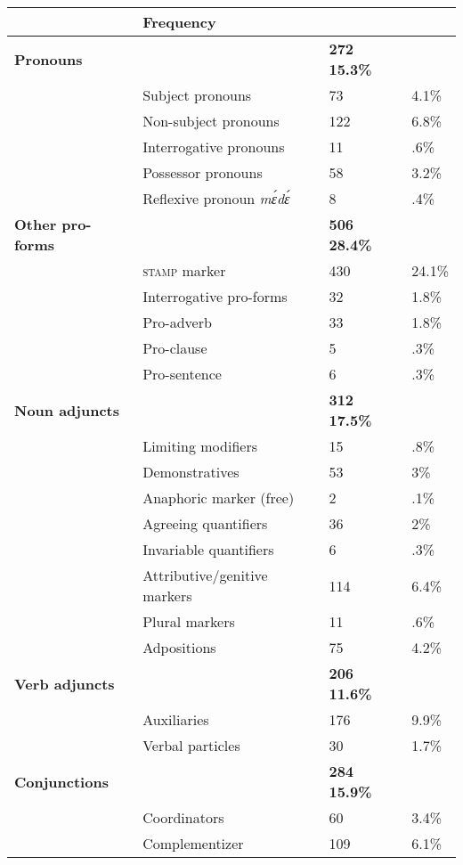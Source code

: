 \begin{table}
\small
\begin{tabular}{ll|ll}
 \lsptoprule
  \multicolumn{2}{l}{Word class} &  \multicolumn{2}{l}{Frequency}  \\ %
 \midrule
 {\bfseries Pronouns}  &  & {\bfseries 272} {\bfseries 15.3\%} \\ %
  & Subject pronouns  & 73 & 4.1\% \\
  & Non-subject pronouns  & 122 & 6.8\% \\
  & Interrogative pronouns  &  11 & .6\% \\
  & Possessor pronouns  & 58 & 3.2\% \\
  & Reflexive pronoun {\itshape mɛ́dɛ́}  & 8 & .4\% \\
 {\bfseries Other pro-forms} &   & {\bfseries 506} {\bfseries 28.4\%} \\
  & \textsc{stamp} marker  & 430 & 24.1\% \\
  & Interrogative pro-forms  & 32  & 1.8\% \\
  & Pro-adverb & 33 & 1.8\% \\
  & Pro-clause &  5 & .3\% \\
  & Pro-sentence & 6 & .3\% \\
 {\bfseries Noun adjuncts} &  & {\bfseries 312} {\bfseries 17.5\%} \\
 & Limiting modifiers  &  15 & .8\% \\
 & Demonstratives  & 53  & 3\% \\
 & Anaphoric marker (free)  & 2 & .1\% \\ %
 & Agreeing quantifiers   & 36 & 2\% \\
 & Invariable quantifiers   & 6 & .3\% \\
 & Attributive/genitive markers   & 114  & 6.4\% \\
 & Plural markers  & 11 & .6\% \\
 & Adpositions   & 75 & 4.2\% \\
 {\bfseries Verb adjuncts} &  & {\bfseries 206} {\bfseries 11.6\%} \\
 & Auxiliaries   &  176 & 9.9\% \\
 & Verbal particles   & 30 & 1.7\% \\
 {\bfseries Conjunctions} &  & {\bfseries 284} {\bfseries 15.9\%} \\
 & Coordinators   & 60 & 3.4\% \\
 & Complementizer  & 109 & 6.1\% \\

\end{tabular}
\end{table}
